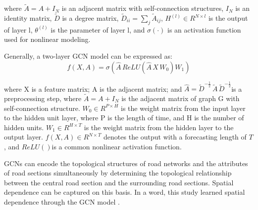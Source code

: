 \documentclass[10pt,journal,compsoc]{IEEEtran}
\begin{document}
\par where $\widetilde{A}=A+I_{N}$ is an adjacent matrix with self-connection structures, $I_{N}$ is an identity matrix, $\widetilde{D}$ is a degree matrix, $\widetilde{D}_{ii}=\sum_{j}\widetilde{A}_{ij}$, $H^{\left(l\right)}\in R^{N\times l}$ is the output of layer l, $\theta^{\left(l\right)}$ is the parameter of layer l, and $\sigma(\cdot)$ is an activation function used for nonlinear modeling.
\par Generally, a two-layer GCN model \cite{kipf2016semisupervised} can be expressed as:
\begin{equation}
f\left(X,A\right) = \sigma\left(\widehat{A}\,ReLU\left(\widehat{A}\, X\,W_{0}\right)W_{1}\right)
\end{equation}
\par where X is a feature matrix; A is the adjacent matrix; and $\widehat{A} = \widetilde{D}^{-\frac{1}{2}}\,\widetilde{A} \,\widetilde{D}^{-\frac{1}{2}}$is a preprocessing step, where $\widetilde{A}=A+I_{N}$ is the adjacent matrix of graph G with self-connection structure. $W_{0}\in R^{P\times H}$ is the weight matrix from the input layer to the hidden unit layer, where P is the length of time, and H is the number of hidden units. $W_{1}\in R^{H\times T}$ is the weight matrix from the hidden layer to the output layer. $f\left(X,A\right)\in R^{N\times T}$ denotes the output with a forecasting length of  $T$, and $ReLU()$is a common nonlinear activation function.

\par GCNs can encode the topological structures of road networks and the attributes of road sections simultaneously by determining the topological relationship between the central road section and the surrounding road sections. Spatial dependence can be captured on this basis. In a word, this study learned spatial dependence through the GCN model \cite{kipf2016semisupervised}.
\end{document}
